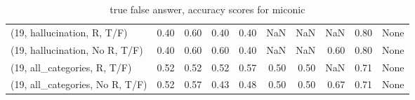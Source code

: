 \begin{table*}[h!]
\begin{adjustbox}{width=2\columnwidth,center}
\begin{tabular}{lrrr|rrr|rrr}
(19, hallucination, R, T/F)           &                      0.40 &                  0.60 &                      0.40 &                          0.40 &                       NaN &                           NaN &                                    NaN &                               0.80 &                                  None \\
(19, hallucination, No R, T/F)        &                      0.40 &                  0.60 &                      0.60 &                          0.40 &                       NaN &                           NaN &                                   0.60 &                               0.80 &                                  None \\
(19, all\_categories, R, T/F)          &                      0.52 &                  0.52 &                      0.52 &                          0.57 &                      0.50 &                          0.50 &                                    NaN &                               0.71 &                                  None \\
(19, all\_categories, No R, T/F)       &                      0.52 &                  0.57 &                      0.43 &                          0.48 &                      0.50 &                          0.50 &                                   0.67 &                               0.71 &                                  None \\


\bottomrule
\end{tabular}
\end{adjustbox}
\caption{true false answer, accuracy scores for miconic}
\end{table*}